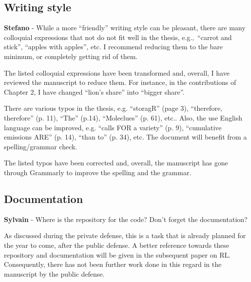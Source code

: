 \documentclass[12pt,a4paper]{article}
\def\eg{e.g.,\ }
\begin{document}
\subsection{Writing style}
\label{writing_style}

\begin{mdframed}[style=comment] %
{\color{orange} \textbf{Stefano}} - While a more ``friendly'' writing style can be pleasant, there are many colloquial expressions that not do not fit well in the thesis, \eg ``carrot and stick'', ``apples with apples'', etc. I recommend reducing them to the bare minimum, or completely getting rid of them. 
\end{mdframed}

\noindent The listed colloquial expressions have been transformed and, overall, I have reviewed the manuscript to reduce them. For instance, {\color{blue} in the contributions of Chapter 2}, I have changed ``lion's share'' into ``bigger share''.

\begin{mdframed}[style=comment] %
There are various typos in the thesis, e.g. ``storagR'' (page 3), ``therefore, therefore'' (p. 11), ``The'' (p.14), ``Moleclues'' (p. 61), etc.. Also, the use English language can be improved, e.g. ``calls FOR a variety'' (p. 9), ``cumulative emissions ARE'' (p. 14), ``than to'' (p. 34), etc. The document will benefit from a spelling/grammar check.
\end{mdframed}

\noindent The listed typos have been corrected and, overall, the manuscript has gone through Grammarly to improve the spelling and the grammar.

\subsection{Documentation}
\label{documentation}

\begin{mdframed}[style=comment] %
{\color{purple} \textbf{Sylvain}} - Where is the repository for the code? Don't forget the documentation?
\end{mdframed}

\noindent As discussed during the private defense, this is a task that is already planned for the year to come, after the public defense. A better reference towards these repository and documentation will be given in the subsequent paper on RL. Consequently, there has not been further work done in this regard in the manuscript by the public defense.
\end{document}
